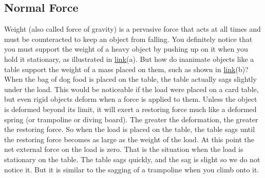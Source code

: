 \documentclass[
]{book}
\begin{document}
\hypertarget{fs-id2422399}{}
\hypertarget{normal-force}{%
\subsection{Normal Force}\label{normal-force}}

\protect\hypertarget{import-auto-id1910210}{}{Weight} (also called force of
gravity) is a pervasive force that acts at all times and must be
counteracted to keep an object from falling. You definitely notice that
you must support the weight of a heavy object by pushing up on it when
you hold it stationary, as illustrated in
\protect\hyperlink{import-auto-id2672874}{link}(a). But how do
inanimate objects like a table support the weight of a mass placed on
them, such as shown in
\protect\hyperlink{import-auto-id2672874}{link}(b)? When the bag
of dog food is placed on the table, the table actually sags slightly
under the load. This would be noticeable if the load were placed on a
card table, but even rigid objects deform when a force is applied to
them. Unless the object is deformed beyond its limit, it will exert a
restoring force much like a deformed spring (or trampoline or diving
board). The greater the deformation, the greater the restoring force. So
when the load is placed on the table, the table sags until the restoring
force becomes as large as the weight of the load. At this point the net
external force on the load is zero. That is the situation when the load
is stationary on the table. The table sags quickly, and the sag is
slight so we do not notice it. But it is similar to the sagging of a
trampoline when you climb onto it.
\end{document}
